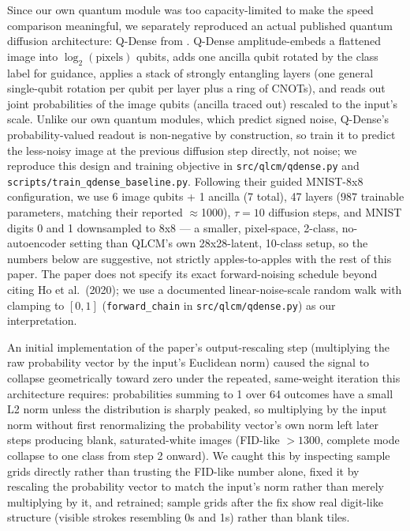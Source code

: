\documentclass[11pt]{article}
\begin{document}
Since our own quantum module was too capacity-limited to make the speed
comparison meaningful, we separately reproduced an actual published quantum
diffusion architecture: Q-Dense from \citet{kolle2024qddm}. Q-Dense
amplitude-embeds a flattened image into $\log_2(\text{pixels})$ qubits, adds
one ancilla qubit rotated by the class label for guidance, applies a stack of
strongly entangling layers (one general single-qubit rotation per qubit per
layer plus a ring of CNOTs), and reads out joint probabilities of the image
qubits (ancilla traced out) rescaled to the input's scale. Unlike our own
quantum modules, which predict signed noise, Q-Dense's probability-valued
readout is non-negative by construction, so \citet{kolle2024qddm} train it to
predict the less-noisy image at the previous diffusion step directly, not
noise; we reproduce this design and training objective in
\texttt{src/qlcm/qdense.py} and \texttt{scripts/train\_qdense\_baseline.py}.
Following their guided MNIST-8x8 configuration, we use 6 image qubits + 1
ancilla (7 total), 47 layers ($987$ trainable parameters, matching their
reported $\approx$1000), $\tau=10$ diffusion steps, and MNIST digits 0 and 1
downsampled to 8x8 --- a smaller, pixel-space, 2-class, no-autoencoder setting
than QLCM's own 28x28-latent, 10-class setup, so the numbers below are
suggestive, not strictly apples-to-apples with the rest of this paper. The
paper does not specify its exact forward-noising schedule beyond citing Ho et
al.\ (2020); we use a documented linear-noise-scale random walk with clamping
to $[0,1]$ (\texttt{forward\_chain} in \texttt{src/qlcm/qdense.py}) as our
interpretation.

An initial implementation of the paper's output-rescaling step (multiplying
the raw probability vector by the input's Euclidean norm) caused the signal
to collapse geometrically toward zero under the repeated, same-weight
iteration this architecture requires: probabilities summing to 1 over 64
outcomes have a small L2 norm unless the distribution is sharply peaked, so
multiplying by the input norm without first renormalizing the probability
vector's own norm left later steps producing blank, saturated-white images
(FID-like $>1300$, complete mode collapse to one class from step 2 onward).
We caught this by inspecting sample grids directly rather than trusting the
FID-like number alone, fixed it by rescaling the probability vector to match
the input's norm rather than merely multiplying by it, and retrained; sample
grids after the fix show real digit-like structure (visible strokes
resembling 0s and 1s) rather than blank tiles.
\end{document}
